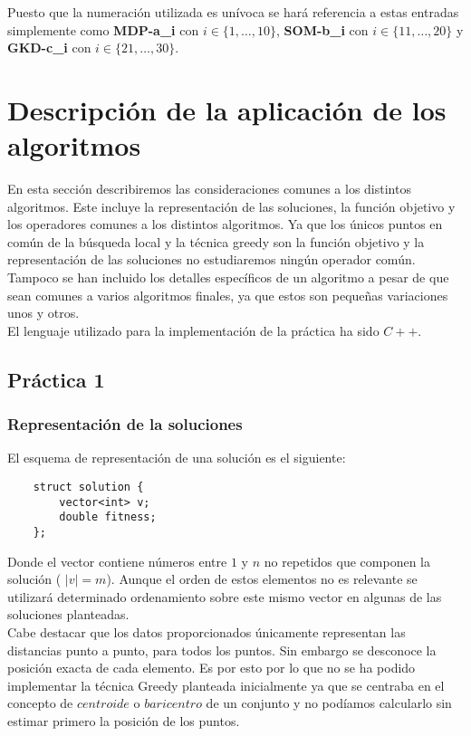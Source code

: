 \documentclass[11pt,a4paper]{article}
\begin{document}
	Puesto que la numeración utilizada es unívoca se hará referencia a estas entradas simplemente como \textbf{MDP-a\_i} con $i\in\{1,\dotsc,10\}$, \textbf{SOM-b\_i} con $i\in\{11,\dotsc,20\}$ y \textbf{GKD-c\_i} con $i\in\{21,\dotsc,30\}$.
	
	\section{Descripción de la aplicación de los algoritmos}
	
	En esta sección describiremos las consideraciones comunes a los distintos algoritmos. Este incluye la representación de las soluciones, la función objetivo y los operadores comunes a los distintos algoritmos. Ya que los únicos puntos en común de la búsqueda local y la técnica greedy son la función objetivo y la representación de las soluciones no estudiaremos ningún operador común. Tampoco se han incluido los detalles específicos de un algoritmo a pesar de que sean comunes a varios algoritmos finales, ya que estos son pequeñas variaciones unos y otros.  \\
	
	El lenguaje utilizado para la implementación de la práctica ha sido $C++$. 
	
	\subsection{Práctica 1}
	
	\subsubsection{Representación de la soluciones}
	
	El esquema de representación de una solución es el siguiente:

	\begin{lstlisting}
	struct solution {
		vector<int> v;
		double fitness;
	};
	\end{lstlisting}
	
	Donde el vector contiene números entre $1$ y $n$ no repetidos que componen la solución ( $|v| = m$). Aunque el orden de estos elementos no es relevante se utilizará determinado ordenamiento sobre este mismo vector en algunas de las soluciones planteadas. \\
	
	Cabe destacar que los datos proporcionados únicamente representan las distancias punto a punto, para todos los puntos. Sin embargo se desconoce la posición exacta de cada elemento. Es por esto por lo que no se ha podido implementar la técnica Greedy planteada inicialmente ya que se centraba en el concepto de $centroide$ o $baricentro$ de un conjunto y no podíamos calcularlo sin estimar primero la posición de los puntos. \\
	
\end{document}
